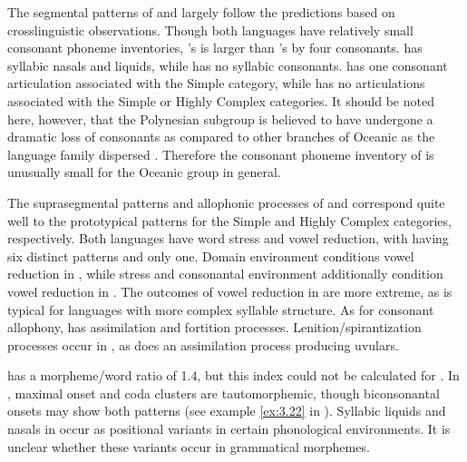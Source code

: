   The segmental patterns of  and  largely follow the predictions based on crosslinguistic observations. Though both languages have relatively small consonant phoneme inventories, ’s is larger than ’s by four consonants.  has syllabic nasals and liquids, while  has no syllabic consonants.  has one consonant articulation associated with the Simple category, while  has no articulations associated with the Simple or Highly Complex categories. It should be noted here, however, that the Polynesian subgroup is believed to have undergone a dramatic loss of consonants as compared to other branches of Oceanic as the language family dispersed \citep{Trudgill2004}. Therefore the consonant phoneme inventory of  is unusually small for the Oceanic group in general.

  The suprasegmental patterns and allophonic processes of  and  correspond quite well to the prototypical patterns for the Simple and Highly Complex categories, respectively. Both languages have word stress and vowel reduction, with  having six distinct patterns and  only one. Domain environment conditions vowel reduction in , while stress and consonantal environment additionally condition vowel reduction in . The outcomes of vowel reduction in  are more extreme, as is typical for languages with more complex syllable structure. As for consonant allophony,  has assimilation and fortition processes. Lenition/spirantization processes occur in , as does an assimilation process producing uvulars.

   has a morpheme/word ratio of 1.4, but this index could not be calculated for . In , maximal onset and coda clusters are tautomorphemic, though biconsonantal onsets may show both patterns (see example \ref{ex:3.22} in ). Syllabic liquids and nasals in  occur as positional variants in certain phonological environments. It is unclear whether these variants occur in grammatical morphemes.


